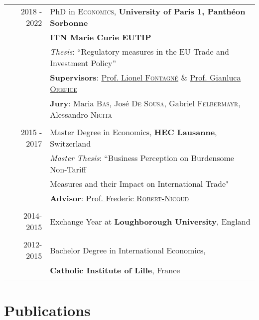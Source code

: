 \documentclass[a4paper,10pt]{article} %
\begin{document}
\begin{tabular}{r|l}	
2018 - 2022 &  PhD in \textsc{Economics}, \textbf{University of Paris 1, Panthéon Sorbonne } \\
&  \textbf{ITN Marie Curie EUTIP}  \\
& \textit{Thesis}: ``Regulatory measures in the EU Trade and Investment Policy'' \\ & \small \textbf{Supervisors}: \href{http://www.lionel-fontagne.eu}{Prof. Lionel \textsc{Fontagné}} \& \href{https://sites.google.com/site/oreficegianluca/home}{Prof. Gianluca \textsc{Orefice}}\\ 
& \small \textbf{Jury}: Maria \textsc{Bas}, José \textsc{De Sousa}, Gabriel \textsc{Felbermayr}, Alessandro \textsc{Nicita} \\ 
\multicolumn{2}{c}{} \\

2015 - 2017 & Master Degree in Economics, \textbf{HEC Lausanne}, Switzerland  \\
& \textit{Master Thesis}: ``Business Perception on Burdensome Non-Tariff \\ & Measures and their Impact on International Trade" \\
& \small \textbf{Advisor}: \href{https://frobertnicoud.weebly.com}{Prof. Frederic \textsc{Robert-Nicoud}}\\
\multicolumn{2}{c}{} \\


2014-2015 & Exchange Year at \textbf{Loughborough University}, England\\
\multicolumn{2}{c}{} \\


2012-2015& Bachelor Degree in International Economics, \\ &\textbf{Catholic Institute of Lille}, France  \\
&\\
\end{tabular}


\section{\textcolor{bluegray}{Publications}}
\end{document}
